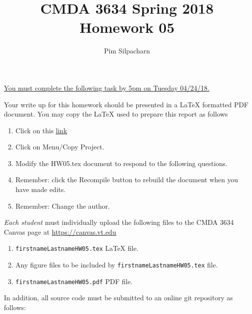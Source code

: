 \documentclass{article}
\newcommand{\pad}{\vspace{8pt}\noindent}
\newcommand{\myhref}[2]{\href{#1}{\color{foo}\underline{#2}\color{black}}}
\begin{document}
\title{CMDA 3634 Spring 2018 Homework 05}

\author{Pim Silpacharn}
\vspace{-64pt}\maketitle
\begin{center}\underline{You must complete the following task by 5pm on Tuesday 04/24/18.}\end{center}
Your write up for this homework should be presented in a {\LaTeX} formatted PDF document. You may copy the \LaTeX{} used to prepare this report as follows

\begin{enumerate}
\item Click on this  \myhref{https://www.sharelatex.com/read/cyvqcnwmfnsc}{link} 
\item Click on Menu/Copy Project.
\item Modify the HW05.tex document to respond to the following questions. 
\item Remember: click the Recompile button to rebuild the document when you have made edits.
\item Remember: Change the author. 

\end{enumerate}

\pad \emph{Each student} must individually upload the following files to the CMDA 3634 Canvas page at \myhref{https://canvas.vt.edu}{https://canvas.vt.edu}

\begin{enumerate}
\item \verb|firstnameLastnameHW05.tex| {\LaTeX} file.
\item Any figure files to be included by \verb|firstnameLastnameHW05.tex| file.
\item \verb|firstnameLastnameHW05.pdf| PDF file.
\end{enumerate}

\noindent In addition, all source code must be submitted to an online git repository as follows:
\end{document}
